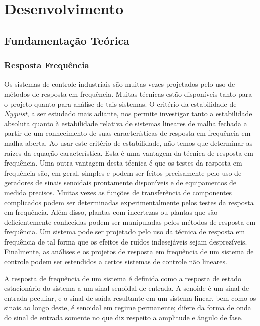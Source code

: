 \setcounter{topnumber}{5}
\setcounter{bottomnumber}{5}
\setcounter{totalnumber}{5}

\chapter{Desenvolvimento}
\section{Fundamentação Teórica}


\subsection{Resposta Frequência}

Os sistemas de controle industriais são muitas vezes projetados pelo uso de métodos de resposta em frequência. Muitas técnicas estão disponíveis tanto para o projeto quanto para análise de tais sistemas. O critério da estabilidade de \textit{Nyquist}, a ser estudado mais adiante, nos permite investigar tanto a estabilidade absoluta quanto à estabilidade relativa de sistemas lineares de malha fechada a partir de um conhecimento de suas características de resposta em frequência em malha aberta. Ao usar este critério de estabilidade, não temos que determinar as raízes da equação característica. Esta é uma vantagem da técnica de resposta em frequência. Uma outra vantagem desta técnica é que os testes da resposta em frequência são, em geral, simples e podem ser feitos precisamente pelo uso de geradores de sinais senoidais prontamente disponíveis e de equipamentos de medida precisos. Muitas vezes as funções de transferência de componentes complicados podem ser determinadas experimentalmente pelos testes da resposta em frequência. Além disso, plantas com incertezas ou plantas que são deficientemente conhecidas podem ser manipuladas pelos métodos de resposta em frequência. Um sistema pode ser projetado pelo uso da técnica de resposta em frequência de tal forma que os efeitos de ruídos indesejáveis sejam desprezíveis. Finalmente, as análises e os projetos de resposta em frequência de um sistema de controle podem ser estendidos a certos sistemas de controle não lineares. 

A resposta de frequência de um sistema é definida como a resposta de estado estacionário do sistema a um sinal senoidal de entrada. A senoide é um sinal de entrada peculiar, e o sinal de saída resultante em um sistema linear, bem como os sinais ao longo deste, é senoidal em regime permanente; difere da forma de onda do sinal de entrada somente no que diz respeito a amplitude e ângulo de fase.


